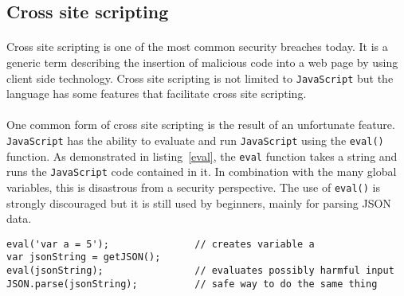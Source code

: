 \subsection{Cross site scripting}
\paragraph{}
Cross site scripting is one of the most common security breaches today\cite{owasp}. It is a generic term describing the insertion of malicious code into a web page by using client side technology. Cross site scripting is not limited to \texttt{JavaScript} but the language has some features that facilitate cross site scripting.
\paragraph{}
One common form of cross site scripting is the result of an unfortunate feature. \texttt{JavaScript} has the ability to evaluate and run \texttt{JavaScript} using the \texttt{eval()} function. As demonstrated in listing~\ref{eval}, the \texttt{eval} function takes a string and runs the \texttt{JavaScript} code contained in it. In combination with the many global variables, this is disastrous from a security perspective. The use of \texttt{eval()} is strongly discouraged but it is still used by beginners, mainly for parsing JSON data.
\begin{lstlisting}[caption={eval().},label={eval}]
eval('var a = 5');               // creates variable a
var jsonString = getJSON();
eval(jsonString);                // evaluates possibly harmful input
JSON.parse(jsonString);          // safe way to do the same thing
\end{lstlisting}

